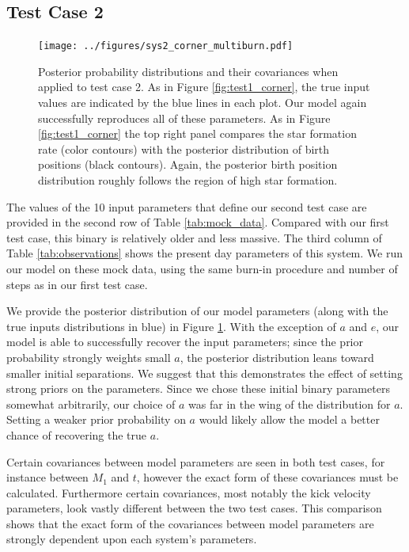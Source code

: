 \documentclass[usenatbib]{mnras}
\begin{document}
\subsection{Test Case 2}

\begin{figure}
\begin{center}
\texttt{[image: ../figures/sys2\_corner\_multiburn.pdf]}
\caption{Posterior probability distributions and their covariances when applied to test case 2. As in Figure \ref{fig:test1_corner}, the true input values are indicated by the blue lines in each plot. Our model again successfully reproduces all of these parameters. As in Figure \ref{fig:test1_corner} the top right panel compares the star formation rate (color contours) with the posterior distribution of birth positions (black contours). Again, the posterior birth position distribution roughly follows the region of high star formation.}
\label{fig:test2_corner}
\end{center}
\end{figure}

The values of the 10 input parameters that define our second test case are provided in the second row of Table \ref{tab:mock_data}. Compared with our first test case, this binary is relatively older and less massive. The third column of Table \ref{tab:observations} shows the present day parameters of this system. We run our model on these mock data, using the same burn-in procedure and number of steps as in our first test case.

We provide the posterior distribution of our model parameters (along with the true inputs distributions in blue) in Figure \ref{fig:test2_corner}. With the exception of $a$ and $e$, our model is able to successfully recover the input parameters; since the prior probability strongly weights small $a$, the posterior distribution leans toward smaller initial separations. We suggest that this demonstrates the effect of setting strong priors on the parameters. Since we chose these initial binary parameters somewhat arbitrarily, our choice of $a$ was far in the wing of the distribution for $a$. Setting a weaker prior probability on $a$ would likely allow the model a better chance of recovering the true $a$.

Certain covariances between model parameters are seen in both test cases, for instance between $M_1$ and $t$, however the exact form of these covariances must be calculated. Furthermore certain covariances, most notably the kick velocity parameters, look vastly different between the two test cases. This comparison shows that the exact form of the covariances between model parameters are strongly dependent upon each system's parameters. 
\end{document}
